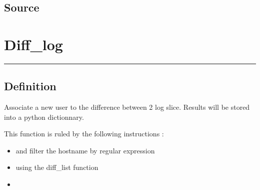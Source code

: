 \documentclass[letterpaper,10pt,english]{sphinxmanual}
\begin{document}
\subsection{Source}
\label{\detokenize{OUP/diff_list:source}}
\begin{sphinxVerbatim}[commandchars=\\\{\}]
 

        \PYG{p}{[}\PYG{p}{]}
           
                    
         
\end{sphinxVerbatim}

\sphinxstepscope

\newpage
\section{Diff\_log}
\label{\detokenize{OUP/Diff_log:diff-log}}\label{\detokenize{OUP/Diff_log::doc}}
\begin{sphinxVerbatim}[commandchars=\\\{\}]
 
\end{sphinxVerbatim}


\bigskip\hrule\bigskip



\subsection{Definition}
\label{\detokenize{OUP/Diff_log:definition}}
\sphinxAtStartPar
Associate a new user to the difference between 2 log slice. Results will be stored into a python dictionnary.

\sphinxAtStartPar
This function is ruled by the following instructions :
\begin{itemize}
\item {} 
\sphinxAtStartPar
{} and filter the hostname by regular expression

\item {} 
\sphinxAtStartPar
{} using the diff\_list function

\item {} 
\sphinxAtStartPar
{}

\end{itemize}
\end{document}
